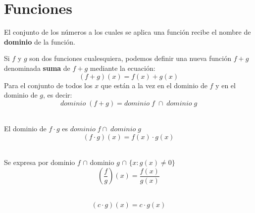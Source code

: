 \chapter{Funciones}


\begin{tcolorbox}[colframe=white]
    \begin{def.}
	El conjunto de los números a los cuales se aplica una función recibe el nombre de \textbf{dominio} de la función.
    \end{def.}
\end{tcolorbox}

\begin{tcolorbox}[colframe=white]
    \begin{def.}
	Si $f$ \; y \; $g$ son dos funciones cualesquiera, podemos definir una nueva función $f+g$ denominada \textbf{suma} de $f+g$ mediante la ecuación:
	$$(f+g)(x)=f(x)+g(x)$$
	Para el conjunto de todos los $x$ que están a la vez en el dominio de $f$ y en el dominio de $g$, es decir: $$dominio \; (f+g)=dominio \; f \; \cap \; dominio \; g$$\\
    \end{def.}
\end{tcolorbox}

\begin{tcolorbox}[colframe=white]
    \begin{def.}
	El dominio de $f \cdot g$ es $dominio \; f \cap \; dominio \; g$ $$(f \cdot g)(x)=f(x)\cdot g(x)$$\\
    \end{def.}
\end{tcolorbox}

\begin{tcolorbox}[colframe=white]
    \begin{def.}
	Se expresa por dominio $f$ $\cap$ dominio $g$ $\cap$ $\lbrace x:g(x)\neq 0 \rbrace$
	$$\left( \dfrac{f}{g}\right) (x)=\dfrac{f(x)}{g(x)}$$ \\
    \end{def.}
\end{tcolorbox}

\begin{tcolorbox}[colframe=white]
    \begin{def.}
	$$(c \cdot g)(x)=c \cdot g(x)$$\\
    \end{def.}
\end{tcolorbox}

